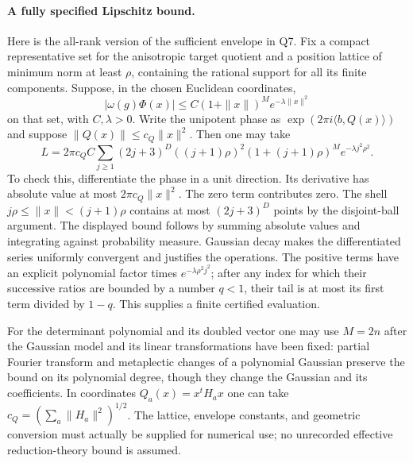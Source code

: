 \paragraph{A fully specified Lipschitz bound.}
Here is the all-rank version of the sufficient envelope in Q7.
Fix a compact representative set for the anisotropic target
quotient and a position lattice of minimum norm at least $\rho$,
containing the rational support for all its finite components.
Suppose, in the chosen Euclidean coordinates,
\[
 |\omega(g)\Phi(x)|
      \leq C(1+\|x\|)^M e^{-\lambda\|x\|^2}
\]
on that set, with $C,\lambda>0$. Write the unipotent phase as
$\exp(2\pi i\langle b,Q(x)\rangle)$ and suppose
$\|Q(x)\|\leq c_Q\|x\|^2$. Then one may take
\begin{equation}\label{Q10-L}
 L=2\pi c_QC\sum_{j\geq1}(2j+3)^D
       ((j+1)\rho)^2(1+(j+1)\rho)^M
                   e^{-\lambda j^2\rho^2}.
\end{equation}
To check this, differentiate the phase in a unit direction.
Its derivative has absolute value at most
$2\pi c_Q\|x\|^2$. The zero term contributes zero.
The shell $j\rho\leq\|x\|<(j+1)\rho$ contains at most
$(2j+3)^D$ points by the disjoint-ball argument. The displayed
bound follows by summing absolute values and integrating against
probability measure. Gaussian decay makes the differentiated
series uniformly convergent and justifies the operations.
The positive terms have an explicit polynomial factor times
$e^{-\lambda\rho^2j^2}$; after any index for which their
successive ratios are bounded by a number $q<1$, their tail is
at most its first term divided by $1-q$. This supplies a finite
certified evaluation.

For the determinant polynomial and its doubled vector one may
use $M=2n$ after the Gaussian model and its linear transformations
have been fixed: partial Fourier transform and metaplectic
changes of a polynomial Gaussian preserve the bound on its
polynomial degree, though they change the Gaussian and its
coefficients. In coordinates $Q_a(x)=x^tH_ax$ one can take
$c_Q=(\sum_a\|H_a\|^2)^{1/2}$. The lattice, envelope constants,
and geometric conversion must actually be supplied for numerical
use; no unrecorded effective reduction-theory bound is assumed.

